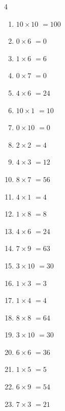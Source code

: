 \begin{multicols}{4}
\begin{enumerate}
  \item $10\times 10$
        $=100$

  \item $0\times 6$
        $=0$

  \item $1\times 6$
        $=6$

  \item $0\times 7$
        $=0$

  \item $4\times 6$
        $=24$

  \item $10\times 1$
        $=10$

  \item $0\times 10$
        $=0$

  \item $2\times 2$
        $=4$

  \item $4\times 3$
        $=12$

  \item $8\times 7$
        $=56$

  \item $4\times 1$
        $=4$

  \item $1\times 8$
        $=8$

  \item $4\times 6$
        $=24$

  \item $7\times 9$
        $=63$

  \item $3\times 10$
        $=30$

  \item $1\times 3$
        $=3$

  \item $1\times 4$
        $=4$

  \item $8\times 8$
        $=64$

  \item $3\times 10$
        $=30$

  \item $6\times 6$
        $=36$

  \item $1\times 5$
        $=5$

  \item $6\times 9$
        $=54$

  \item $7\times 3$
        $=21$


\end{enumerate}
\end{multicols}
